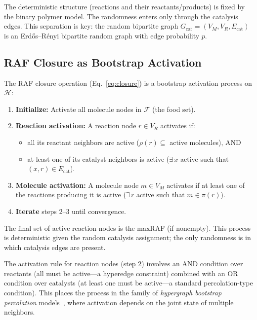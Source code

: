 \documentclass[preprint,12pt]{elsarticle}
\newcommand{\food}{\mathcal{F}}
\begin{document}
The deterministic structure (reactions and their
reactants/products) is fixed by the binary polymer model.
The randomness enters only through the catalysis edges.
This separation is key: the random bipartite graph
$G_{\text{cat}} = (V_M, V_R, E_{\text{cat}})$ is an
Erd\H{o}s--R\'enyi bipartite random graph with edge
probability $p$.

\subsection{RAF Closure as Bootstrap Activation}
\label{sec:bootstrap_map}

The RAF closure operation (Eq.~\ref{eq:closure}) is
a bootstrap activation process on $\mathcal{H}$:

\begin{enumerate}
\item \textbf{Initialize:} Activate all molecule nodes in
$\food$ (the food set).
\item \textbf{Reaction activation:} A reaction node
$r \in V_R$ activates if:
\begin{itemize}
\item[(a)] all its reactant neighbors are active
($\rho(r) \subseteq$ active molecules), AND
\item[(b)] at least one of its catalyst neighbors is active
($\exists\, x$ active such that $(x, r) \in E_{\text{cat}}$).
\end{itemize}
\item \textbf{Molecule activation:} A molecule node
$m \in V_M$ activates if at least one of the reactions
producing it is active ($\exists\, r$ active such that
$m \in \pi(r)$).
\item \textbf{Iterate} steps 2--3 until convergence.
\end{enumerate}

The final set of active reaction nodes is the maxRAF
(if nonempty). This process is deterministic given the
random catalysis assignment; the only randomness is in
which catalysis edges are present.

The activation rule for reaction nodes (step 2) involves
an AND condition over reactants (all must be active---a
hyperedge constraint) combined with an OR condition over
catalysts (at least one must be active---a standard
percolation-type condition). This places the process
in the family of \emph{hypergraph bootstrap percolation}
models~\cite{balogh2012sharp}, where activation depends
on the joint state of multiple neighbors.
\end{document}
